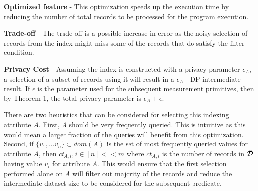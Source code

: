 \squishlist
\item \textbf{Optimized feature} - This optimization speeds up the execution time by reducing the number of total records to be processed for the program execution.
\item \textbf{Trade-off} - The trade-off is  a possible increase in error as the noisy selection of records from the index might miss some of the records that do satisfy the filter condition.
\item \textbf{Privacy Cost} - Assuming the index is constructed with a privacy parameter $\epsilon_A$, a selection of a subset of records using it will result in a $\epsilon_A$ - DP intermediate result. If $\epsilon$ is the parameter used for the subsequent measurement primitives, then by Theorem 1, the total privacy parameter is $\epsilon_A+\epsilon$.
\squishend

 There are two heuristics that can be considered for selecting this indexing attribute $A$. First, $A$ should be very frequently queried. This is intuitive as this would mean a larger fraction of the queries will benefit from this optimization. Second, if $\{v_1,...v_n\} \subset dom(A)$ is the set of most frequently queried values for attribute $A$, then $ct_{A,i}, i \in [n] << m$ where $ct_{A,i}$ is the number of records in $\boldsymbol{\tilde{\mathcal{D}}}$ having value $v_i$ for attribute $A$. This would ensure that the first selection performed alone on $A$ will filter out majority of the records and reduce the intermediate dataset size to be considered for the subsequent predicate. 


